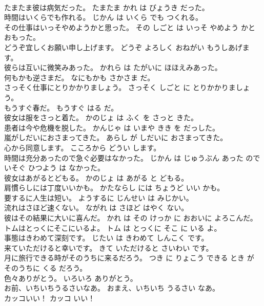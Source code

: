 \documentclass[8pt]{extreport}
\begin{document}
\begin{CJK}{UTF8}{min}
\\	たまたま彼は病気だった。	たまたま かれ は びょうき だった。	
\\	時間はいくらでも作れる。	じかん は いくら でも つくれる。	
\\	その仕事はいっそやめようかと思った。	その しごと は いっそ やめよう かと おもった。	
\\	どうぞ宜しくお願い申し上げます。	どうぞ よろしく おねがい もうしあげます。	
\\	彼らは互いに微笑みあった。	かれら は たがいに ほほえみあった。	
\\	何もかも逆さまだ。	なにもかも さかさま だ。	
\\	さっそく仕事にとりかかりましょう。	さっそく しごと に とりかかりましょう。	
\\	もうすぐ春だ。	もうすぐ はる だ。	
\\	彼女は服をさっと着た。	かのじょ は ふく を さっと きた。	
\\	患者は今や危機を脱した。	かんじゃ は いまや きき を だっした。	
\\	嵐がしだいにおさまってきた。	あらし が しだいに おさまってきた。	
\\	心から同意します。	こころから どうい します。	
\\	時間は充分あったので急ぐ必要はなかった。	じかん は じゅうぶん あった ので いそぐ ひつよう は なかった。	
\\	彼女はあがるとどもる。	かのじょ は あがる と どもる。	
\\	肩慣らしには丁度いいかも。	かたならし には ちょうど いい かも。	
\\	要するに人生は短い。	ようするに じんせい は みじかい。	
\\	流れはさほど速くない。	ながれ は さほど はやく ない。	
\\	彼はその結果に大いに喜んだ。	かれ は その けっか に おおいに よろこんだ。	
\\	トムはとっくにそこにいるよ。	トム は とっくに そこ に いる よ。	
\\	事態はきわめて深刻です。	じたい は きわめて しんこく です。	
\\	来ていただけると幸いです。	きて いただけると さいわい です。	
\\	月に旅行できる時がそのうちに来るだろう。	つき に りょこう できる とき が そのうちに くる だろう。	
\\	色々ありがとう。	いろいろ ありがとう。	
\\	お前、いちいちうるさいなあ。	おまえ、いちいち うるさい なあ。	
\\	カッコいい！	カッコ いい！	

\end{CJK}
\end{document}
